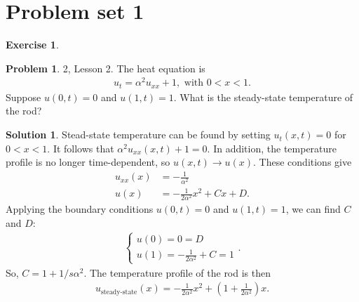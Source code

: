 \documentclass{book}
\theoremstyle{definition}
\newtheorem*{prob*}{Problem}
\newtheorem*{exer*}{Exercise}
\newtheorem*{sln*}{Solution}
\begin{document}
\section{Problem set 1}
\begin{exer*}
	\begin{prob*}2, Lesson 2.
		The heat equation is
		\begin{align*}
		u_t = \alpha^2 u_{xx} + 1, \text{ with }0 < x < 1.
		\end{align*}
		Suppose $u(0,t) = 0$ and $u(1,t) = 1$. What is the steady-state temperature of the rod?\\
		\begin{sln*}
			Stead-state temperature can be found by setting $u_t(x,t) = 0$ for $0 < x < 1$. It follows that $\alpha^2 u_{xx}(x,t) + 1 = 0$. In addition, the temperature profile is no longer time-dependent, so $u(x,t)\to u(x)$. These conditions give
			\begin{align*}
			u_{xx}(x) &= -\frac{1}{\alpha^2}\\
			u(x) &= -\frac{1}{2\alpha^2}x^2 + Cx + D.
			\end{align*} 
			Applying the boundary conditions $u(0,t)=0$ and $u(1,t)=1$, we can find $C$ and $D$:
			\begin{align*}
			\begin{cases}
			u(0) = 0 = D\\
			u(1) = -\frac{1}{2\alpha^2} + C = 1
			\end{cases}.
			\end{align*}
			So, $C = 1 + 1/s\alpha^2$. The temperature profile of the rod is then
			\begin{align*}
			u_{\text{steady-state}}(x) = -\frac{1}{2\alpha^2}x^2 + \left(1 + \frac{1}{2\alpha^2} \right)x .
			\end{align*}
		\end{sln*}
	\end{prob*}
	
	\newpage
	

\end{exer*}
\end{document}
